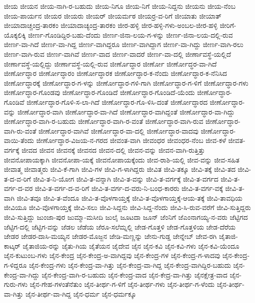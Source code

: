 ಜೀಯ
ಜೀಯನ
ಜೀಯ-ನಾಗಿ-ರ-ಬಹುದು
ಜೀಯ-ನಿಗೂ
ಜೀಯ-ನಿಗೆ
ಜೀಯ-ನಿದ್ದನು
ಜೀಯನು
ಜೀಯ-ನೆಂಬ
ಜೀಯ-ಪಾರ್ಯನ
ಜೀಯರ
ಜೀಯರು
ಜೀಯರ್
ಜೀಯರ್ಮಠ
ಜೀಯರ್ರ-ವ-ರಿಗೆ
ಜೀಯಾತು
ಜೀಯಾತ್
ಜೀಯಾದಾಚ್ಚಂದ್ರ-ತಾರಕಂ
ಜೀಯಾದಾಚ್ಯಂದ್ರ-ತಾರಕಂ
ಜೀರ-ಹಳ್ಳಿ
ಜೀರ-ಹಳ್ಳಿ-ಗಳು-ಅಂಬಲ-ಜೀರ-ಹಳ್ಳಿ
ಜೀರಿಗೆ-ಯೊಕ್ಕಲಿಕ್ಕಿ
ಜೀರ್ಣ-ಗೊಂಡಿದ್ದಿರ-ಬಹು-ದೆಂದು
ಜೀರ್ಣ-ಜಿನಾ-ಲಯ-ಗ-ಳನ್ನು
ಜೀರ್ಣ-ಜಿನಾ-ಲಯ-ದಲ್ಲಿ-ರುವ
ಜೀರ್ಣ-ವಾ-ಗಿದೆ
ಜೀರ್ಣ-ವಾ-ಗಿದ್ದ
ಜೀರ್ಣ-ವಾಗಿದ್ದರೂ
ಜೀರ್ಣ-ವಾಗಿದ್ದಾಗ
ಜೀರ್ಣ-ವಾ-ಗಿದ್ದು
ಜೀರ್ಣ-ವಾಗಿ-ರಲು
ಜೀರ್ಣ-ವಾಗಿ-ರುವ
ಜೀರ್ಣ-ವಾಗಿವೆ
ಜೀರ್ಣ-ವಾದ
ಜೀರ್ಣ-ವಾದರೆ
ಜೀರ್ಣ-ವಾ-ದಲ್ಲಿ
ಜೀರ್ಣಾವಸ್ಥೆ-ಯಲ್ಲಿದೆ
ಜೀರ್ಣಾವಸ್ಥೆ-ಯಲ್ಲಿದ್ದು
ಜೀರ್ಣಾವಸ್ಥೆ-ಯಲ್ಲಿ-ರುವ
ಜೀರ್ಣೊದ್ಧಾರ
ಜೀರ್ಣೋ
ಜೀರ್ಣೋದ್ಧರ-ವಾ-ಗಿದೆ
ಜೀರ್ಣೋದ್ಧಾರ
ಜೀರ್ಣೋದ್ಧಾರಂ
ಜೀರ್ಣೋದ್ಧಾರಕ
ಜೀರ್ಣೋದ್ಧಾರ-ಕ-ನೆಂದು
ಜೀರ್ಣೋದ್ಧಾರ-ಕ-ನೆನಿಸಿದ
ಜೀರ್ಣೋದ್ಧಾರಕ್ಕೆ
ಜೀರ್ಣೋದ್ಧಾರ-ಗ-ಳನ್ನು
ಜೀರ್ಣೋದ್ಧಾರ-ಗಳಿ-ಗಾಗಿ
ಜೀರ್ಣೋದ್ಧಾರ-ಗ-ಳಿಗೆ
ಜೀರ್ಣೋದ್ಧಾರ-ಗಳು
ಜೀರ್ಣೋದ್ಧಾರ-ಗೊಂಡವು
ಜೀರ್ಣೋದ್ಧಾರ-ಗೊಂಡಿದೆ
ಜೀರ್ಣೋದ್ಧಾರ-ಗೊಂಡಿದೆ-ಯೆಂದು
ಜೀರ್ಣೋದ್ಧಾರ-ಗೊಂಡಿವೆ
ಜೀರ್ಣೋದ್ಧಾರ-ಗೊಳಿ-ಸ-ಲಾ-ಗಿದೆ
ಜೀರ್ಣೋದ್ಧಾರ-ಗೊ-ಳಿಸಿ-ದಂತೆ
ಜೀರ್ಣೋದ್ಧಾರದ
ಜೀರ್ಣೋದ್ಧಾರ-ವನ್ನು
ಜೀರ್ಣೋದ್ಧಾರ-ವಾಗಿ
ಜೀರ್ಣೋದ್ಧಾರ-ವಾ-ಗಿದೆ
ಜೀರ್ಣೋದ್ಧಾರ-ವಾಗಿದ್ದಂತೆ
ಜೀರ್ಣೋದ್ಧಾರ-ವಾ-ಗಿದ್ದು
ಜೀರ್ಣೋದ್ಧಾರ-ವಾಗಿ-ರ-ಬಹುದು
ಜೀರ್ಣೋದ್ಧಾರ-ವಾಗಿ-ರ-ವಂತೆ
ಜೀರ್ಣೋದ್ಧಾರ-ವಾಗಿ-ರುವ
ಜೀರ್ಣೋದ್ಧಾರ-ವಾಗಿ-ರು-ವಂತೆ
ಜೀರ್ಣೋದ್ಧಾರ-ವಾಗಿವೆ
ಜೀರ್ಣೋದ್ಧಾರ-ವಾ-ದಲ್ಲಿ
ಜೀರ್ಣೋದ್ಧಾರ-ವಾದವು
ಜೀರ್ಣೋದ್ಧಾರ-ವಾಯಿ-ತೆಂದು
ಜೀರ್ಣೋದ್ಧಾರ-ವಿಜಯ-ನ-ಗರದ
ಜೀವಂತ-ವಾಗಿ
ಜೀವಂಧರ
ಜೀವಂಧರ-ನೆಂಬ
ಜೀವ-ಕಳೆ
ಜೀವತ-ವರ್ಗಕ್ಕೆ
ಜೀವದ
ಜೀವನ
ಜೀವನಕ್ಕೆ
ಜೀವನದ
ಜೀವನ-ದಲ್ಲಿ
ಜೀವನ-ವನ್ನು
ಜೀವನ-ವಾಗಿ-ರುತ್ತಿತ್ತು
ಜೀವನೋಪಾಯಕ್ಕಾಗಿ
ಜೀವನೋಪಾ-ಯಕ್ಕೆ
ಜೀವನೋಪಾಯಕ್ಕೆಂದು
ಜೀವ-ರಾಶಿ-ಯಲ್ಲಿ
ಜೀವ-ವನ್ನು
ಜೀವ-ಸಹಿತ
ಜೀವಾತ್ಮ
ಜೀವಾತ್ಮರು
ಜೀವಿ-ಕೆ-ಗಾಗಿ
ಜೀವಿ-ಗಳ
ಜೀವಿ-ಗ-ಳಾಗಿದ್ದರು
ಜೀವಿತ
ಜೀವಿ-ತಕ್ಕೂ
ಜೀವಿ-ತಕ್ಕೆ
ಜೀವಿ-ತದ
ಜೀವಿ-ತ-ದ-ವ-ರಿಗೆ
ಜೀವಿ-ತ-ನಿ-ಯೋಗ
ಜೀವಿ-ತ-ವನ್ನಾಗಿ
ಜೀವಿ-ತ-ವನ್ನು
ಜೀವಿ-ತ-ವರ್ಗಕ್ಕೆ
ಜೀವಿ-ತ-ವರ್ಗದ
ಜೀವಿ-ತ-ವರ್ಗ-ದ-ವರ
ಜೀವಿ-ತ-ವರ್ಗ-ದ-ವ-ರಿಗೆ
ಜೀವಿ-ತ-ವರ್ಗ-ದ-ವರು-ನಿ-ಬಂಧ-ಕಾರರು
ಜೀವಿ-ತ-ವರ್ಗ-ವಕ್ಕೆ
ಜೀವಿ-ತ-ವಾಗಿ
ಜೀವಿ-ತವೂ
ಜೀವಿ-ತ-ವೆಂದೂ
ಜೀವಿ-ತ-ವೊಳಗಾಯ್ತಕ್ಕೆ
ಜೀವಿ-ತ-ವೊಳಗಾಯ್ತಕ್ಕೆ-ಆಯ-ತಕ್ಕೆ
ಜೀವಿ-ತಾವಧಿಯ
ಜೀವಿಯೂ
ಜೀವಿ-ವೊಳಗಾಯ್ತಕ್ಕೆ
ಜೀವಿ-ಸಲು
ಜೀವಿ-ಸಿದ್ದನು
ಜೀವಿ-ಸಿದ್ದ-ನೆಂದು
ಜೀವಿ-ಸಿ-ರುವ-ವರೆಗೆ
ಜೀವಿ-ಸುತ್ತಿದ್ದರು
ಜೀವಿ-ಸುತ್ತಿದ್ದು
ಜುಂಜಾ-ಪುರ
ಜುಮ್ಮಾ-ಮಸೀದಿ
ಜುಲೈ
ಜೂಟದಾ
ಜೂನ್
ಜೆಂನಿಗೆ
ಜೆಎಂನಾಗಯ್ಯ-ನ-ವರು
ಜೆಟ್ಟಿಗದ
ಜೆಟ್ಟಿಗ-ದಲ್ಲಿ
ಜೆಟ್ಟಿಗ-ವನ್ನು
ಜೆಡಲ
ಜೆಡೆಯ
ಜೆರೂ-ಸಲೆಮ್ನಲ್ಲಿ
ಜೇಡ-ಗೊತ್ತಳಿ
ಜೇಡ-ಗೊತ್ತಳಿಯ
ಜೇಡ-ದೆರೆಯ
ಜೇಡರ
ಜೇಡರ-ದಾಸಿ-ಮಯ್ಯನ
ಜೇಡರ-ಮೊಜ್ಜನ
ಜೇಡಿ-ಮಣ್ಣನ್ನು
ಜೇನು-ಗುಡ್ಡ
ಜೇನ್ನೇಬ್
ಜೇವ-ರಗಿ
ಜೈತಾಜಿ-ಕಾಟ್ಕರ್
ಜೈತಾಜಿಯ-ರನ್ನು
ಜೈತು-ಗಿಯ
ಜೈತೆಯನ
ಜೈದೇವ
ಜೈನ
ಜೈನ-ಕವಿ
ಜೈನ-ಕವಿ-ಗಳು
ಜೈನ-ಕವಿ-ಯೆಂದೂ
ಜೈನ-ಕುಟುಂಬ-ಗಳು
ಜೈನ-ಕೇಂದ್ರ
ಜೈನ-ಕೇಂದ್ರ-ಅ-ವಾಗಿದ್ದವು
ಜೈನ-ಕೇಂದ್ರ-ಗಳ
ಜೈನ-ಕೇಂದ್ರ-ಗ-ಳಾದವು
ಜೈನ-ಕೇಂದ್ರ-ಗ-ಳಿದ್ದರೂ
ಜೈನ-ಕೇಂದ್ರ-ಗಳು
ಜೈನ-ಕೇಂದ್ರ-ವಾ-ಗಿತ್ತು
ಜೈನ-ಕೇಂದ್ರ-ವಾ-ಗಿದ್ದ
ಜೈನ-ಕೇಂದ್ರ-ವಾಗಿದ್ದಿರ-ಬಹುದು
ಜೈನ-ಕೇಂದ್ರ-ವಾ-ಗಿದ್ದು
ಜೈನ-ಕೇಂದ್ರ-ವಾಗಿ-ರ-ಬಹುದು
ಜೈನ-ಕೇಂದ್ರ-ವಾದ
ಜೈನ-ಕೇದ್ರ-ವಾ-ಗಿತ್ತು
ಜೈನಕ್ಷೇತ್ರ-ವಾದ
ಜೈನ-ಗುರು-ಗಳು
ಜೈನ-ಗೇಹ-ಗಳಂತೆನೆತುಂ
ಜೈನ-ತೀರ್ಥ-ಗ-ಳಿಗೆ
ಜೈನ-ತೀರ್ಥ-ಗಳು
ಜೈನ-ತೀರ್ಥ-ಗ-ಳೆಂದು
ಜೈನ-ತೀರ್ಥ-ವಾ-ಗಿತ್ತು
ಜೈನ-ತೀರ್ಥ-ವಾ-ಗಿದ್ದ
ಜೈನ-ಧರ್ಮ
ಜೈನ-ಧರ್ಮಕ್ಕೂ
